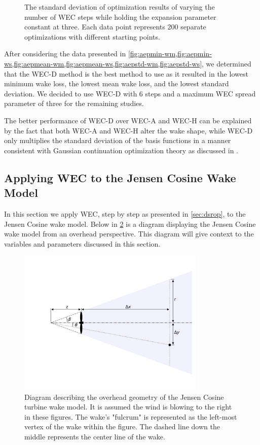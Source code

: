 \documentclass[a4paper]{jpconf}
\begin{document}
\begin{figure}[ht]
\begin{minipage}[t]{0.47\textwidth}
		\caption{The standard deviation of optimization results of varying the number of WEC steps while holding the expansion parameter constant at three. Each data point represents 200 separate optimizations with different starting points.}
		\label{fig:aepstd-ws}
	\end{minipage}
\end{figure}

 After considering the data presented in \cref{fig:aepmin-wm,fig:aepmin-ws,fig:aepmean-wm,fig:aepmean-ws,fig:aepstd-wm,fig:aepstd-ws}, we determined that the WEC-D method is the best method to use as it resulted in the lowest minimum wake loss, the lowest mean wake loss, and the lowest standard deviation. We decided to use WEC-D with 6 steps and a maximum WEC spread parameter of three for the remaining studies.
 
 The better performance of WEC-D over WEC-A and WEC-H can be explained by the fact that both WEC-A and WEC-H alter the wake shape, while WEC-D only multiplies the standard deviation of the basis functions in a manner consistent with Gaussian continuation optimization theory as discussed in \cite{mobahi2015}.
 
\subsection{Applying WEC to the Jensen Cosine Wake Model}
In this section we apply WEC, step by step as presented in \cref{sec:dsrop}, to the Jensen Cosine wake model. Below in \cref{fig:JensenDiagrams} is a diagram displaying the Jensen Cosine wake model from an overhead perspective. This diagram will give context to the variables and parameters discussed in this section.

\begin{figure}[h]
	\centering
	\includegraphics[width=0.8\textwidth,trim={0cm 2cm 0cm 0cm} ]{jensen_diagram}
	\caption{Diagram describing the overhead geometry of the Jensen Cosine turbine wake model. It is assumed the wind is blowing to the right in these figures. The wake's "fulcrum" is represented as the left-most vertex of the wake within the figure. The dashed line down the middle represents the center line of the wake.}
	\label{fig:JensenDiagrams}
\end{figure}
\end{document}
